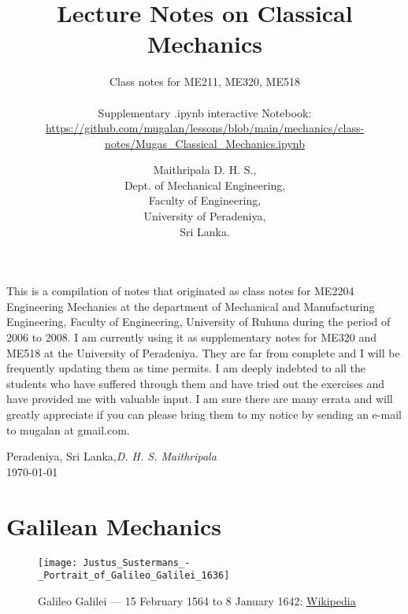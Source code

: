 \documentclass[graybox,envcountchap,sectrefs]{svmonoMuga}
\begin{document}
\author{{Maithripala D. H. S., \\
Dept. of Mechanical Engineering, \\
Faculty of Engineering, \\
University of Peradeniya, \\
Sri Lanka.}
}
\title{Lecture Notes on Classical Mechanics}
\subtitle{Class notes for ME211, ME320, ME518\\
\mbox{}\\
\small{Supplementary .ipynb interactive Notebook:\\
\url{https://github.com/mugalan/lessons/blob/main/mechanics/class-notes/Mugas_Classical_Mechanics.ipynb}}\\}
\maketitle
\preface
This is a compilation of notes that originated as class notes for ME2204 Engineering Mechanics at the department 
of Mechanical and Manufacturing Engineering, Faculty of Engineering, University of Ruhuna during the period of 2006 to 2008.  I am currently  using it as supplementary notes for ME320 and ME518 at the 
University of Peradeniya. They are far from complete and I will be frequently 
updating them as time permits.
I am deeply indebted to all the students who have suffered through them and have tried out the exercises and have provided me with valuable input. I am sure there are many errata 
and will greatly appreciate if you can please bring them to my notice by sending an e-mail to mugalan at gmail.com. %

\vspace{\baselineskip}
\begin{flushright}\noindent
Peradeniya, Sri Lanka,\hfill {\it D. H. S. Maithripala}\\
\today \\
\end{flushright}




\tableofcontents








\chapter{Galilean Mechanics}


\begin{figure}
\centering
\texttt{[image: Justus\_Sustermans\_-\_Portrait\_of\_Galileo\_Galilei\_1636]}\label{Fig:Galileo}
\caption{Galileo Galilei --- 15 February 1564 to 8 January 1642: \href{https://en.wikipedia.org/wiki/Galileo_Galilei}{Wikipedia} }
\end{figure}
\end{document}
